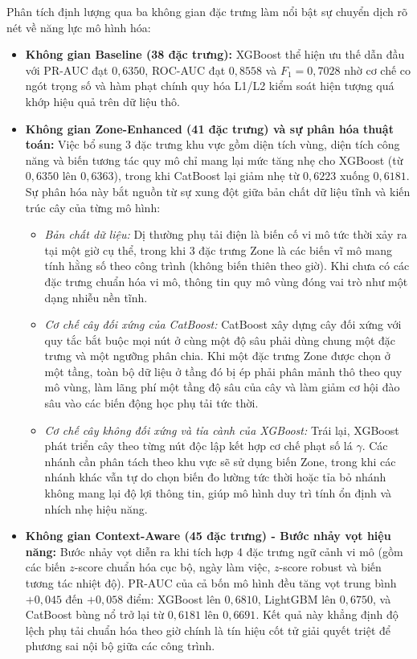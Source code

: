 Phân tích định lượng qua ba không gian đặc trưng làm nổi bật sự chuyển dịch rõ nét về năng lực mô hình hóa:
\begin{itemize}
    \item \textbf{Không gian Baseline (38 đặc trưng):} XGBoost thể hiện ưu thế dẫn đầu với PR-AUC đạt $0{,}6350$, ROC-AUC đạt $0{,}8558$ và $F_1 = 0{,}7028$ nhờ cơ chế co ngót trọng số và hàm phạt chính quy hóa L1/L2 kiểm soát hiện tượng quá khớp hiệu quả trên dữ liệu thô.
    \item \textbf{Không gian Zone-Enhanced (41 đặc trưng) và sự phân hóa thuật toán:} Việc bổ sung 3 đặc trưng khu vực gồm diện tích vùng, diện tích công năng và biến tương tác quy mô chỉ mang lại mức tăng nhẹ cho XGBoost (từ $0{,}6350$ lên $0{,}6363$), trong khi CatBoost lại giảm nhẹ từ $0{,}6223$ xuống $0{,}6181$. Sự phân hóa này bắt nguồn từ sự xung đột giữa bản chất dữ liệu tĩnh và kiến trúc cây của từng mô hình:
    \begin{itemize}
        \item \textit{Bản chất dữ liệu:} Dị thường phụ tải điện là biến cố vi mô tức thời xảy ra tại một giờ cụ thể, trong khi 3 đặc trưng Zone là các biến vĩ mô mang tính hằng số theo công trình (không biến thiên theo giờ). Khi chưa có các đặc trưng chuẩn hóa vi mô, thông tin quy mô vùng đóng vai trò như một dạng nhiễu nền tĩnh.
        \item \textit{Cơ chế cây đối xứng của CatBoost:} CatBoost xây dựng cây đối xứng với quy tắc bắt buộc mọi nút ở cùng một độ sâu phải dùng chung một đặc trưng và một ngưỡng phân chia. Khi một đặc trưng Zone được chọn ở một tầng, toàn bộ dữ liệu ở tầng đó bị ép phải phân mảnh thô theo quy mô vùng, làm lãng phí một tầng độ sâu của cây và làm giảm cơ hội đào sâu vào các biến động học phụ tải tức thời.
        \item \textit{Cơ chế cây không đối xứng và tỉa cành của XGBoost:} Trái lại, XGBoost phát triển cây theo từng nút độc lập kết hợp cơ chế phạt số lá $\gamma$. Các nhánh cần phân tách theo khu vực sẽ sử dụng biến Zone, trong khi các nhánh khác vẫn tự do chọn biến đo lường tức thời hoặc tỉa bỏ nhánh không mang lại độ lợi thông tin, giúp mô hình duy trì tính ổn định và nhích nhẹ hiệu năng.
    \end{itemize}
    \item \textbf{Không gian Context-Aware (45 đặc trưng) - Bước nhảy vọt hiệu năng:} Bước nhảy vọt diễn ra khi tích hợp 4 đặc trưng ngữ cảnh vi mô (gồm các biến $z$-score chuẩn hóa cục bộ, ngày làm việc, $z$-score robust và biến tương tác nhiệt độ). PR-AUC của cả bốn mô hình đều tăng vọt trung bình $+0{,}045$ đến $+0{,}058$ điểm: XGBoost lên $0{,}6810$, LightGBM lên $0{,}6750$, và CatBoost bùng nổ trở lại từ $0{,}6181$ lên $0{,}6691$. Kết quả này khẳng định độ lệch phụ tải chuẩn hóa theo giờ chính là tín hiệu cốt tử giải quyết triệt để phương sai nội bộ giữa các công trình.
\end{itemize}

